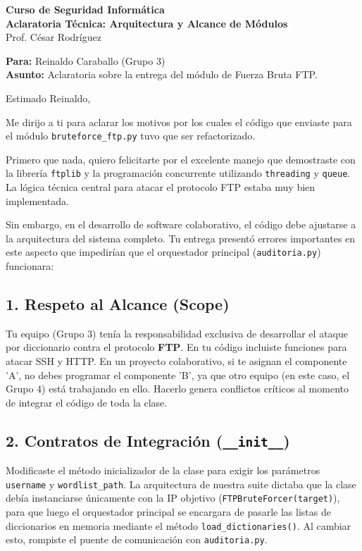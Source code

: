 \documentclass[12pt,letterpaper]{article}
\begin{document}
\begin{center}
    \Large \textbf{Curso de Seguridad Informática} \\
    \large \textbf{Aclaratoria Técnica: Arquitectura y Alcance de Módulos} \\
    \vspace{0.3cm}
    \normalsize Prof. César Rodríguez \\
\end{center}

\vspace{0.5cm}

\noindent \textbf{Para:} Reinaldo Caraballo (Grupo 3) \\
\textbf{Asunto:} Aclaratoria sobre la entrega del módulo de Fuerza Bruta FTP.

\vspace{0.5cm}

\noindent Estimado Reinaldo,

\vspace{0.3cm}
Me dirijo a ti para aclarar los motivos por los cuales el código que enviaste para el módulo \texttt{bruteforce\_ftp.py} tuvo que ser refactorizado. 

Primero que nada, quiero felicitarte por el excelente manejo que demostraste con la librería \texttt{ftplib} y la programación concurrente utilizando \texttt{threading} y \texttt{queue}. La lógica técnica central para atacar el protocolo FTP estaba muy bien implementada.

Sin embargo, en el desarrollo de software colaborativo, el código debe ajustarse a la arquitectura del sistema completo. Tu entrega presentó errores importantes en este aspecto que impedirían que el orquestador principal (\texttt{auditoria.py}) funcionara:

\subsection*{1. Respeto al Alcance (Scope)}
Tu equipo (Grupo 3) tenía la responsabilidad exclusiva de desarrollar el ataque por diccionario contra el protocolo \textbf{FTP}. En tu código incluiste funciones para atacar SSH y HTTP. En un proyecto colaborativo, si te asignan el componente 'A', no debes programar el componente 'B', ya que otro equipo (en este caso, el Grupo 4) está trabajando en ello. Hacerlo genera conflictos críticos al momento de integrar el código de toda la clase.

\subsection*{2. Contratos de Integración (\texttt{\_\_init\_\_})}
Modificaste el método inicializador de la clase para exigir los parámetros \texttt{username} y \texttt{wordlist\_path}. La arquitectura de nuestra suite dictaba que la clase debía instanciarse únicamente con la IP objetivo (\texttt{FTPBruteForcer(target)}), para que luego el orquestador principal se encargara de pasarle las listas de diccionarios en memoria mediante el método \texttt{load\_dictionaries()}. Al cambiar esto, rompiste el puente de comunicación con \texttt{auditoria.py}.
\end{document}

